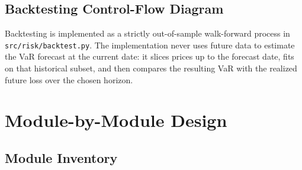 \documentclass[11pt]{article}
\newcommand{\code}[1]{\texttt{#1}}
\begin{document}
\subsection{Backtesting Control-Flow Diagram}

\begin{center}
\end{center}

Backtesting is implemented as a strictly out-of-sample walk-forward
process in \code{src/risk/backtest.py}.  The implementation never uses
future data to estimate the VaR forecast at the current date: it slices
prices up to the forecast date, fits on that historical subset, and then
compares the resulting VaR with the realized future loss over the chosen
horizon.

\section{Module-by-Module Design}

\subsection{Module Inventory}
\end{document}
